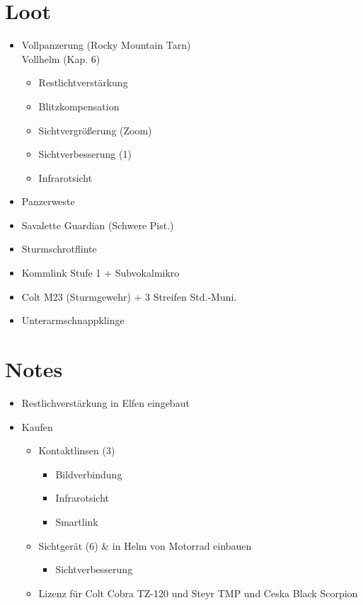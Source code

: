 {\begin{multicols}{2}
\section*{Loot}
\begin{itemize}
	\item Vollpanzerung  (Rocky Mountain Tarn)\\
		Vollhelm (Kap. 6)
		\begin{itemize}
			\item Restlichtverstärkung
			\item Blitzkompensation
			\item Sichtvergrößerung (Zoom)
			\item Sichtverbesserung (1)
			\item Infrarotsicht
		\end{itemize}
	\item Panzerweste
	\item Savalette Guardian (Schwere Pist.)
	\item Sturmschrotflinte
	\item Kommlink Stufe 1 + Subvokalmikro
	\item Colt M23 (Sturmgewehr) + 3 Streifen Std.-Muni.
	\item Unterarmschnappklinge
\end{itemize}
\vphantom{2cm}

\section*{Notes}
\begin{itemize}
	\item Restlichverstärkung in Elfen eingebaut
	\item Kaufen
		\begin{itemize}
			\item Kontaktlinsen (3)
				\begin{itemize}	
					\item Bildverbindung
					\item Infrarotsicht
					\item Smartlink
				\end{itemize}
			\item Sichtgerät (6) \& in Helm von Motorrad einbauen
				\begin{itemize}
					\item Sichtverbesserung
				\end{itemize}
			\item Lizenz für Colt Cobra TZ-120 und Steyr TMP und Ceska Black Scorpion
		\end{itemize}
\end{itemize}
\end{multicols}

}
